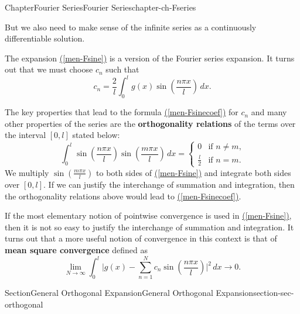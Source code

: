 \documentclass[oneside,10pt,]{book}
\newcommand{\xreffont}{\relax}
\newcommand{\terminology}[1]{\textbf{#1}}
\numberwithin{equation}{section}
\newcommand{\amp}{&}
\begin{document}
\begin{chapterptx}{Chapter}{Fourier Series}{}{Fourier Series}{}{}{chapter-ch-Fseries}
\begin{introduction}{}
\begin{equation}
\end{equation}
But we also need  to make sense of the infinite series as a continuously differentiable solution.%
\par
The expansion \hyperref[men-Fsine]{({\xreffont\ref{men-Fsine}})} is a version of the Fourier series expansion. It turns out that we must choose \(c_{n}\) such that%
\begin{equation}
c_{n}= \frac{2}{l}  \int_{0}^l g(x) \sin \left(\frac{n \pi x}{l}\right) \, dx.\label{men-Fsinecoef}
\end{equation}
%
\par
The key properties that lead to the  formula \hyperref[men-Fsinecoef]{({\xreffont\ref{men-Fsinecoef}})} for \(c_{n}\) and many other properties of the series are the \terminology{orthogonality relations} of the terms over the interval \([0, l]\) stated below:%
\begin{equation*}
\int_{0}^{l}  \sin \left(\frac{n \pi x}{l}\right) \sin \left(\frac{m \pi x}{l}\right) \, dx =
\begin{cases} 0 \amp \text{if $n\ne m$,} \\
\frac l2 \amp \text{if $n= m$.}
\end{cases}
\end{equation*}
We multiply \(\sin \left(\frac{m \pi x}{l}\right)\) to both sides of \hyperref[men-Fsine]{({\xreffont\ref{men-Fsine}})} and integrate both sides over \([0, l]\). If we can justify the interchange of summation and integration, then the orthogonality relations above would lead to \hyperref[men-Fsinecoef]{({\xreffont\ref{men-Fsinecoef}})}.%
\par
If the most elementary notion of pointwise convergence is used in \hyperref[men-Fsine]{({\xreffont\ref{men-Fsine}})}, then it is not so easy to justify the interchange of summation and integration. It turns out that a more useful notion of convergence in this context is that of \terminology{mean square convergence} defined as%
\begin{equation*}
\lim_{N\to \infty} \int_{0}^{l}\vert g(x) - \sum_{n=1}^{N} c_n \sin \left(\frac{n \pi x}{l} \right)\vert^{2} \, dx
\to 0.
\end{equation*}
%
\end{introduction}%
%
%
\typeout{************************************************}
\typeout{************************************************}
%
\begin{sectionptx}{Section}{General Orthogonal Expansion}{}{General Orthogonal Expansion}{}{}{section-sec-orthogonal}

\end{sectionptx}
\end{chapterptx}
\end{document}
